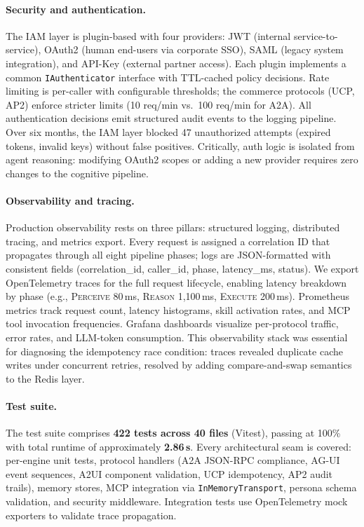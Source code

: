 \documentclass[11pt]{article}
\begin{document}
\paragraph{Security and authentication.} The IAM layer is plugin-based with four providers: JWT (internal service-to-service), OAuth2 (human end-users via corporate SSO), SAML (legacy system integration), and API-Key (external partner access). Each plugin implements a common \texttt{IAuthenticator} interface with TTL-cached policy decisions. Rate limiting is per-caller with configurable thresholds; the commerce protocols (UCP, AP2) enforce stricter limits (10 req/min vs.\ 100 req/min for A2A). All authentication decisions emit structured audit events to the logging pipeline. Over six months, the IAM layer blocked 47 unauthorized attempts (expired tokens, invalid keys) without false positives. Critically, auth logic is isolated from agent reasoning: modifying OAuth2 scopes or adding a new provider requires zero changes to the cognitive pipeline.

\paragraph{Observability and tracing.} Production observability rests on three pillars: structured logging, distributed tracing, and metrics export. Every request is assigned a correlation ID that propagates through all eight pipeline phases; logs are JSON-formatted with consistent fields (correlation\_id, caller\_id, phase, latency\_ms, status). We export OpenTelemetry traces for the full request lifecycle, enabling latency breakdown by phase (e.g., \textsc{Perceive} 80\,ms, \textsc{Reason} 1,100\,ms, \textsc{Execute} 200\,ms). Prometheus metrics track request count, latency histograms, skill activation rates, and MCP tool invocation frequencies. Grafana dashboards visualize per-protocol traffic, error rates, and LLM-token consumption. This observability stack was essential for diagnosing the idempotency race condition: traces revealed duplicate cache writes under concurrent retries, resolved by adding compare-and-swap semantics to the Redis layer.

\paragraph{Test suite.} The test suite comprises \textbf{422 tests across 40 files} (Vitest), passing at 100\% with total runtime of approximately \textbf{2.86\,s}. Every architectural seam is covered: per-engine unit tests, protocol handlers (A2A JSON-RPC compliance, AG-UI event sequences, A2UI component validation, UCP idempotency, AP2 audit trails), memory stores, MCP integration via \texttt{InMemoryTransport}, persona schema validation, and security middleware. Integration tests use OpenTelemetry mock exporters to validate trace propagation.
\end{document}

